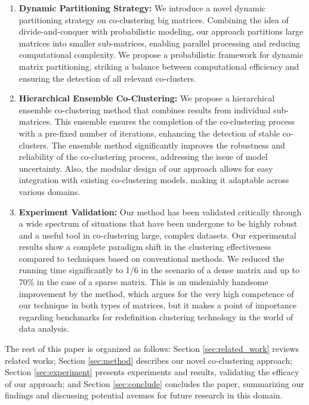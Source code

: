\begin{enumerate}
    \item \textbf{Dynamic Partitioning Strategy:}
          We introduce a novel dynamic partitioning strategy on co-clustering big matrices.
          Combining the idea of divide-and-conquer with probabilistic modeling, our approach partitions large matrices into smaller sub-matrices, enabling parallel processing and reducing computational complexity.
          We propose a probabilistic framework for dynamic matrix partitioning, striking a balance between computational efficiency and ensuring the detection of all relevant co-clusters.
    \item \textbf{Hierarchical Ensemble Co-Clustering:}
          We propose a hierarchical ensemble co-clustering method that combines results from individual sub-matrices.
          This ensemble ensures the completion of the co-clustering process with a pre-fixed number of iterations, enhancing the detection of stable co-clusters.
          The ensemble method significantly improves the robustness and reliability of the co-clustering process, addressing the issue of model uncertainty.
          Also, the modular design of our approach allows for easy integration with existing co-clustering models, making it adaptable across various domains.
    \item \textbf{Experiment Validation:}
          Our method has been validated critically through a wide spectrum of situations that have been undergone to be highly robust and a useful tool in co-clustering large, complex datasets.
          Our experimental results show a complete paradigm shift in the clustering effectiveness compared to techniques based on conventional methods.
          We reduced the running time significantly to 1/6 in the scenario of a dense matrix and up to 70\% in the case of a sparse matrix.
          This is an undeniably handsome improvement by the method, which argues for the very high competence of our technique in both types of matrices, but it makes a point of importance regarding benchmarks for redefinition clustering technology in the world of data analysis.
\end{enumerate}

The rest of this paper is organized as follows: Section \ref{sec:related_work} reviews related works; Section \ref{sec:method} describes our novel co-clustering approach; Section \ref{sec:experiment} presents experiments and results, validating the efficacy of our approach; and Section \ref{sec:conclude} concludes the paper, summarizing our findings and discussing potential avenues for future research in this domain.
